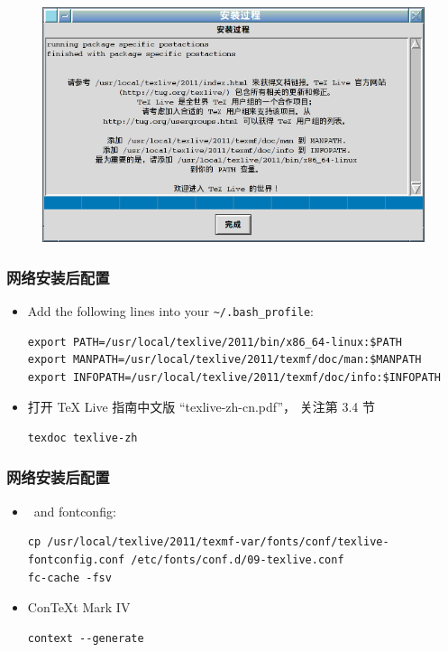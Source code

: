 \documentclass{beamer}
\def\TeXLive{\TeX{} Live\xspace}
\begin{document}
\begin{frame}
  \begin{figure}[h]
  \centering
\includegraphics[scale=0.5]{安装过程.png}
  \end{figure}
\end{frame}

\begin{frame}[fragile]
  \frametitle{网络安装后配置}
\begin{itemize}
  \item 
    Add the following lines into your \nolinkurl{~/.bash_profile}:
    \begin{lstlisting}
export PATH=/usr/local/texlive/2011/bin/x86_64-linux:$PATH
export MANPATH=/usr/local/texlive/2011/texmf/doc/man:$MANPATH
export INFOPATH=/usr/local/texlive/2011/texmf/doc/info:$INFOPATH
    \end{lstlisting}

  \item 
打开 \TeXLive 指南中文版 ``texlive-zh-cn.pdf''，
关注第 3.4 节
  \begin{lstlisting}
texdoc texlive-zh
  \end{lstlisting}

\end{itemize}
\end{frame}

\begin{frame}[fragile]
  \frametitle{网络安装后配置}
  \begin{itemize}
\item
\XeTeX\ and fontconfig:
\begin{lstlisting}
cp /usr/local/texlive/2011/texmf-var/fonts/conf/texlive-fontconfig.conf /etc/fonts/conf.d/09-texlive.conf
fc-cache -fsv
\end{lstlisting}

\item Con\TeX{}t Mark IV
  \begin{lstlisting}
context --generate
  \end{lstlisting}

\end{itemize}
\end{frame}
\end{document}
